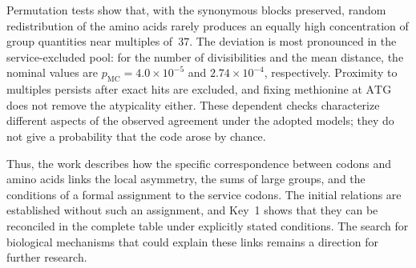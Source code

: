 \documentclass[11pt,a4paper]{article}
\renewcommand{\_}{\origunderscore\allowbreak}
\begin{document}
Permutation tests show that, with the synonymous blocks
preserved, random redistribution of the amino acids rarely
produces an equally high concentration of group quantities
near multiples of~$37$. The deviation is most pronounced in
the service-excluded pool: for the number of divisibilities
and the mean distance, the nominal values are
$p_{\mathrm{MC}}=4.0\times10^{-5}$ and $2.74\times10^{-4}$,
respectively. Proximity to multiples persists after exact hits
are excluded, and fixing methionine at $\mathrm{ATG}$ does not
remove the atypicality either. These dependent checks
characterize different aspects of the observed agreement under
the adopted models; they do not give a probability that the
code arose by chance.

Thus, the work describes how the specific correspondence between
codons and amino acids links the local asymmetry, the sums of
large groups, and the conditions of a formal assignment to the
service codons. The initial relations are established without
such an assignment, and Key~1 shows that they can be reconciled
in the complete table under explicitly stated conditions.
The search for biological mechanisms that could explain these
links remains a direction for further research.


\end{document}
